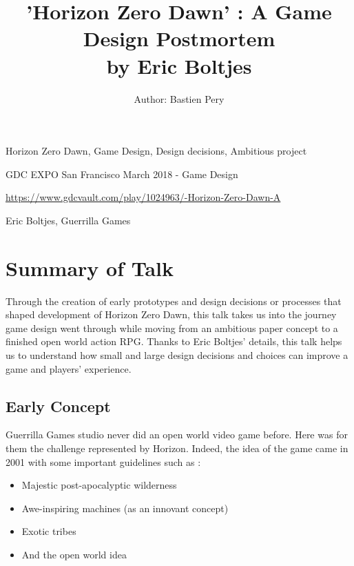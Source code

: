 \documentclass[a4paper]{article}
\title{'Horizon Zero Dawn' : A Game Design Postmortem \\by Eric Boltjes}
\author{Author: Bastien Pery}
\begin{document}
\maketitle

\begin{keywords} Horizon Zero Dawn, Game Design, Design decisions, Ambitious project \end{keywords}

\begin{track} GDC EXPO San Francisco March 2018 - Game Design \end{track}

\begin{talkurl}  \url{https://www.gdcvault.com/play/1024963/-Horizon-Zero-Dawn-A} \end{talkurl}

\begin{speaker}Eric Boltjes, Guerrilla Games \end{speaker}


\begin{abstract}


\end{abstract}

\section{Summary of Talk}


Through the creation of early prototypes and design decisions or processes that shaped
development of Horizon Zero Dawn, this talk takes us into the journey game design went through while 
moving from an ambitious paper concept to a finished open world action RPG. Thanks to Eric Boltjes'
details, this talk helps us to understand how small and large design decisions and choices can 
improve a game and players' experience.

\subsection{Early Concept}

Guerrilla Games studio never did an open world video game before. Here was for them the challenge
represented by Horizon. Indeed, the idea of the game came in 2001 with some important guidelines
such as :

\begin{itemize}
  \item Majestic post-apocalyptic wilderness
  \item Awe-inspiring machines (as an innovant concept)
  \item Exotic tribes
  \item And the open world idea 
\end{itemize}
\end{document}
